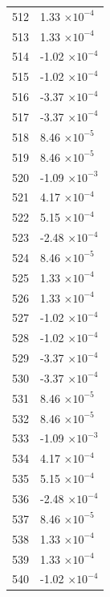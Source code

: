 \documentclass[a4paper,11pt]{article}
\begin{document}
\begin{center}
\begin{longtable}{|R{1.5cm}|R{2.5cm}|}
  512 &         1.33 $\times 10^{          -4}$ \\
  513 &         1.33 $\times 10^{          -4}$ \\
  514 &        -1.02 $\times 10^{          -4}$ \\
  515 &        -1.02 $\times 10^{          -4}$ \\
  516 &        -3.37 $\times 10^{          -4}$ \\
  517 &        -3.37 $\times 10^{          -4}$ \\
  518 &         8.46 $\times 10^{          -5}$ \\
  519 &         8.46 $\times 10^{          -5}$ \\
  520 &        -1.09 $\times 10^{          -3}$ \\
  521 &         4.17 $\times 10^{          -4}$ \\
  522 &         5.15 $\times 10^{          -4}$ \\
  523 &        -2.48 $\times 10^{          -4}$ \\
  524 &         8.46 $\times 10^{          -5}$ \\
  525 &         1.33 $\times 10^{          -4}$ \\
  526 &         1.33 $\times 10^{          -4}$ \\
  527 &        -1.02 $\times 10^{          -4}$ \\
  528 &        -1.02 $\times 10^{          -4}$ \\
  529 &        -3.37 $\times 10^{          -4}$ \\
  530 &        -3.37 $\times 10^{          -4}$ \\
  531 &         8.46 $\times 10^{          -5}$ \\
  532 &         8.46 $\times 10^{          -5}$ \\
  533 &        -1.09 $\times 10^{          -3}$ \\
  534 &         4.17 $\times 10^{          -4}$ \\
  535 &         5.15 $\times 10^{          -4}$ \\
  536 &        -2.48 $\times 10^{          -4}$ \\
  537 &         8.46 $\times 10^{          -5}$ \\
  538 &         1.33 $\times 10^{          -4}$ \\
  539 &         1.33 $\times 10^{          -4}$ \\
  540 &        -1.02 $\times 10^{          -4}$ \\

\end{longtable}
\end{center}
\end{document}
